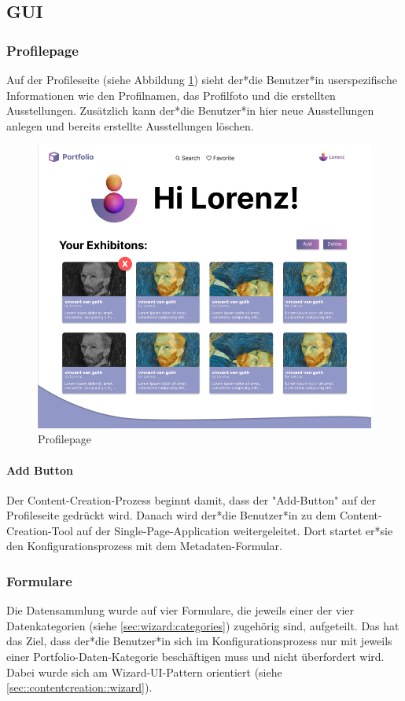 \subsection{GUI}
\subsubsection{Profilepage}
Auf der Profileseite (siehe Abbildung \ref{fig:impl:sign:profile}) sieht der*die Benutzer*in userspezifische Informationen wie den Profilnamen, das Profilfoto und die erstellten Ausstellungen. Zusätzlich kann der*die Benutzer*in hier neue Ausstellungen anlegen und bereits erstellte Ausstellungen löschen.

\begin{figure}
  \centering
  \includegraphics[scale=0.5]{pics/profilepage.png}
  \caption{Profilepage}
  \label{fig:impl:sign:profile}
\end{figure}

\paragraph*{Add Button}
Der Content-Creation-Prozess beginnt damit, dass der "Add-Button" auf der Profileseite gedrückt wird. Danach wird der*die Benutzer*in zu dem Content-Creation-Tool auf der Single-Page-Application weitergeleitet. Dort startet er*sie den Konfigurationsprozess mit dem Metadaten-Formular.


\subsubsection{Formulare}
Die Datensammlung wurde auf vier Formulare, die jeweils einer der vier Datenkategorien (siehe \ref{sec:wizard:categories}) zugehörig sind, aufgeteilt. Das hat das Ziel, dass der*die Benutzer*in sich im Konfigurationsprozess nur mit jeweils einer Portfolio-Daten-Kategorie beschäftigen muss und nicht überfordert wird. Dabei wurde sich am Wizard-UI-Pattern orientiert (siehe \ref{sec::contentcreation::wizard}).



